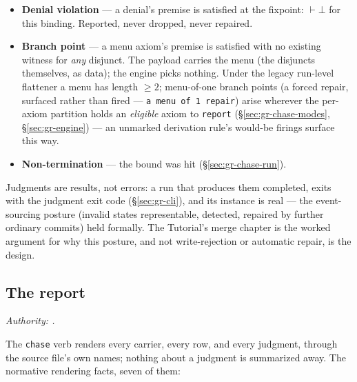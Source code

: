 \begin{itemize}
\item \textbf{Denial violation} — a denial's premise is satisfied at
the fixpoint: $\vdash \bot$ for this binding. Reported, never
dropped, never repaired.
\item \textbf{Branch point} — a menu axiom's premise is satisfied
with no existing witness for \emph{any} disjunct. The payload carries
the menu (the disjuncts themselves, as data); the engine picks
nothing. Under the legacy run-level flattener a menu has length
$\geq 2$; menu-of-one branch points (a forced repair, surfaced rather
than fired — \texttt{a menu of 1 repair}) arise wherever the
per-axiom partition holds an \emph{eligible} axiom to \texttt{report}
(\S\ref{sec:gr-chase-modes}, \S\ref{sec:gr-engine}) — an unmarked
derivation rule's would-be firings surface this way.
\item \textbf{Non-termination} — the bound was hit
(\S\ref{sec:gr-chase-run}).
\end{itemize}

\noindent Judgments are results, not errors: a run that produces
them completed, exits with the judgment exit code
(\S\ref{sec:gr-cli}), and its instance is real — the event-sourcing
posture (invalid states representable, detected, repaired by further
ordinary commits) held formally. The Tutorial's merge chapter is the
worked argument for why this posture, and not write-rejection or
automatic repair, is the design.

\subsection{The report}
\label{sec:gr-report}

\emph{Authority: .}

The \texttt{chase} verb renders every carrier, every row, and every
judgment, through the source file's own names; nothing about a
judgment is summarized away. The normative rendering facts, seven of
them:

